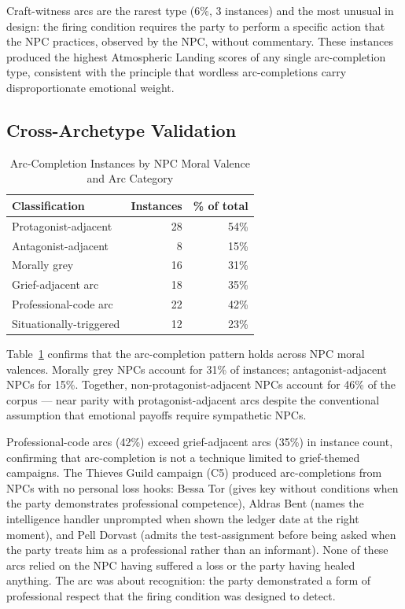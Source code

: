 Craft-witness arcs are the rarest type (6\%, 3 instances) and the most
unusual in design: the firing condition requires the party to perform a
specific action that the NPC practices, observed by the NPC, without
commentary. These instances produced the highest Atmospheric Landing scores
of any single arc-completion type, consistent with the principle that wordless
arc-completions carry disproportionate emotional weight.

\subsection{Cross-Archetype Validation}

\begin{table}[t]
\caption{Arc-Completion Instances by NPC Moral Valence and Arc Category}
\label{tab:moral-valence}
\begin{tabular}{@{}lrr@{}}
\toprule
\textbf{Classification} & \textbf{Instances} & \textbf{\% of total} \\
\midrule
Protagonist-adjacent       & 28 & 54\% \\
Antagonist-adjacent        &  8 & 15\% \\
Morally grey               & 16 & 31\% \\
\midrule
Grief-adjacent arc         & 18 & 35\% \\
Professional-code arc      & 22 & 42\% \\
Situationally-triggered    & 12 & 23\% \\
\bottomrule
\end{tabular}
\end{table}

Table~\ref{tab:moral-valence} confirms that the arc-completion pattern holds
across NPC moral valences. Morally grey NPCs account for 31\% of instances;
antagonist-adjacent NPCs for 15\%. Together, non-protagonist-adjacent NPCs
account for 46\% of the corpus --- near parity with protagonist-adjacent arcs
despite the conventional assumption that emotional payoffs require sympathetic
NPCs.

Professional-code arcs (42\%) exceed grief-adjacent arcs (35\%) in instance
count, confirming that arc-completion is not a technique limited to grief-themed
campaigns. The Thieves Guild campaign (C5) produced arc-completions from NPCs
with no personal loss hooks: Bessa Tor (gives key without conditions when the
party demonstrates professional competence), Aldras Bent (names the intelligence
handler unprompted when shown the ledger date at the right moment), and Pell
Dorvast (admits the test-assignment before being asked when the party treats him
as a professional rather than an informant). None of these arcs relied on the
NPC having suffered a loss or the party having healed anything. The arc was
about recognition: the party demonstrated a form of professional respect that the
firing condition was designed to detect.


